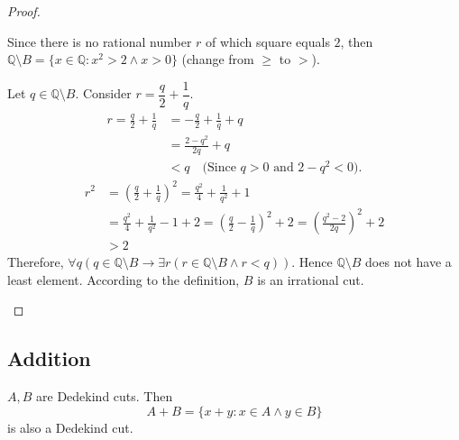 \begin{proof}
\begin{itemize}[topsep=0pt]
              Since there is no rational number $r$ of which square equals $2$, then $\mathbb{Q}\setminus B = \{ x\in\mathbb{Q}: {x}^{2} > 2 \wedge x > 0 \}$ (change from $\ge$ to $>$).

              Let $q\in\mathbb{Q}\setminus B$. Consider $r = \dfrac{q}{2} + \dfrac{1}{q}$.
              \begin{align*}
                  r = \frac{q}{2} + \frac{1}{q} & = -\frac{q}{2} + \frac{1}{q} + q                       \\
                                                & = \frac{2 - {q}^{2}}{2q} + q                           \\
                                                & < q \quad\text{(Since $q > 0$ and $2 - {q}^{2} < 0$)}.
              \end{align*}
              \begin{align*}
                  {r}^{2} & = {\left(\frac{q}{2} + \frac{1}{q}\right)}^{2} = \frac{q^{2}}{4} + \frac{1}{q^{2}} + 1                                                         \\
                          & = \frac{q^{2}}{4} + \frac{1}{q^{2}} - 1 + 2 = {\left(\frac{q}{2} - \frac{1}{q}\right)}^{2} + 2 = {\left( \frac{q^{2} - 2}{2q} \right)}^{2} + 2 \\
                          & > 2
              \end{align*}
              Therefore, $\forall q(q\in\mathbb{Q}\setminus B \rightarrow \exists r( r\in\mathbb{Q}\setminus B \wedge r < q ))$. Hence $\mathbb{Q}\setminus B$ does not have a least element. According to the definition, $B$ is an irrational cut.
    \end{itemize}
\end{proof}

\subsection{Addition}

\begin{theorem}[Addition]
    $A, B$ are Dedekind cuts. Then
    \[
        A + B = \{ x + y : x\in A \wedge y\in B \}
    \]
    is also a Dedekind cut.
\end{theorem}

